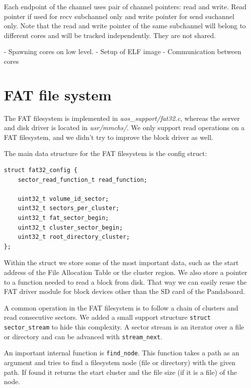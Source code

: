 \documentclass[a4paper,10pt]{article}
\newcommand{\filepath}[1]{\emph{ #1}}
\begin{document}
	Each endpoint of the channel uses pair of channel pointers: read and write. 
	Read pointer if used for recv subchannel only and write pointer for send suchannel only.
	Note that the read and write pointer of the same subchannel will belong to different cores and will be tracked independently.
	They are not shared. 
	
\todo {}

- Spawning cores on low level.
- Setup of ELF image
- Communication between cores

\section{FAT file system}

The FAT filesystem is implemented in \filepath{aos\_support/fat32.c}, whereas the server and disk driver is located in \filepath{usr/mmchs/}.
We only support read operations on a FAT filesystem, and we didn't try to improve the block driver as well.

The main data structure for the FAT filesystem is the config struct:

\begin{lstlisting}
struct fat32_config {
    sector_read_function_t read_function;

    uint32_t volume_id_sector;
    uint32_t sectors_per_cluster;
    uint32_t fat_sector_begin;
    uint32_t cluster_sector_begin;
    uint32_t root_directory_cluster;
};
\end{lstlisting}

Within the struct we store some of the most important data, such as the start address of the File Allocation Table or the cluster region.
We also store a pointer to a function needed to read a block from disk.
That way we can easily reuse the FAT driver module for block devices other than the SD card of the Pandaboard.

A common operation in the FAT filesystem is to follow a chain of clusters and read consecutive sectors.
We added a small support structure \lstinline!struct sector_stream! to hide this complexity.
A sector stream is an iterator over a file or directory and can be advanced with \lstinline!stream_next!.

An important internal function is \lstinline!find_node!.
This function takes a path as an argument and tries to find a filesystem node (file or directory) with the given path.
If found it returns the start cluster and the file size (if it is a file) of the node.
\end{document}

